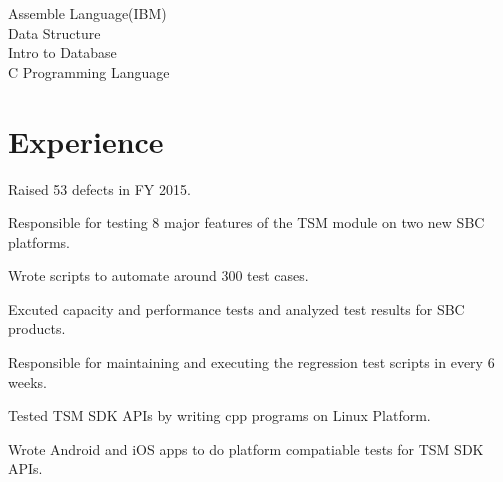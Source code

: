 \documentclass[a4paper]{lyu-resume} %
\begin{document}
\begin{minipage}[t]{0.33\textwidth}
Assemble Language(IBM) \\
Data Structure \\
Intro to Database \\
C Programming Language

\sectionspace %


\end{minipage} %
\hfill
%
%
\begin{minipage}[t]{0.66\textwidth} %


\section{Experience}


\vspace{\topsep} %
\begin{tightitemize}
\item Raised 53 defects in FY 2015.
\item Responsible for testing 8 major features of the TSM module on two new SBC platforms. 
\item Wrote scripts to automate around 300 test cases.
\item Excuted capacity and performance tests and analyzed test results for SBC products.
\item Responsible for maintaining and executing the regression test scripts in every 6 weeks.
\item Tested TSM SDK APIs by writing cpp programs on Linux Platform.
\item Wrote Android and iOS apps to do platform compatiable tests for TSM SDK APIs.
\end{tightitemize}

\sectionspace %



\end{minipage}
\end{document}
